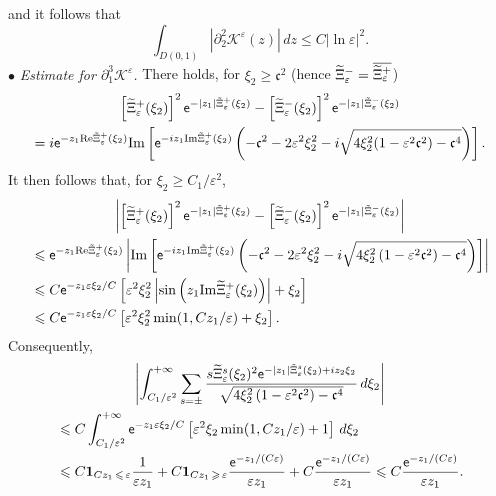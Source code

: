 \documentclass[AHL,Unicode,longabstracts,published]{cedram}
\newcommand*\p{\partial}
\newcommand{\Imm}{\mathrm{Im}}
\newcommand{\Rel}{\mathrm{Re}}
\newcommand*\BK{\mathcal{K}}
\newcommand{\bfun}{\mathbf{1}}
\newcommand*\ex{{\sf e}}
\newcommand*\cs{{\mathfrak c}}
\newcommand*\ii{\infty}
\newcommand*\gs{\geqslant }
\newcommand*\ls{\leqslant }
\newcommand*\e{\varepsilon}
\newcommand*\lne{\lvert \ln \varepsilon \rvert}
\renewcommand*\t{\tilde}
\let\oldtilde\tilde
\renewcommand*{\tilde}[1]{\mathchoice{\widetilde{#1}}{\widetilde{#1}}{\oldtilde{#1}}{\oldtilde{#1}}}
\begin{document}
and it follows that
\[
\int_{D(0,1)} \left\lvert \p_2^2 \BK^\e (z) \right\rvert \, dz \ls C \lne^2.
\]
\noindent $ \bullet $ \emph{Estimate for $ \p_1^3 \BK^\e $.} There holds, for $ \xi_2 \gs \cs^2 $ (hence $ \t\Xi_\e^- = \overline{ \t\Xi_\e^+ }$)
\begin{multline*}
 \left[\t\Xi_\e^+ (\xi_2)\right]^2 \ex^{- |z_1| \t\Xi_\e^+ (\xi_2) } - \left[\t\Xi_\e^- (\xi_2)\right]^2 \ex^{- |z_1| \t\Xi_\e^- (\xi_2) }
\\  = i \ex^{- z_1 \Rel \t\Xi_\e^+ (\xi_2) } \Imm \left[\ex^{- i z_1 \Imm \t\Xi_\e^+ (\xi_2) } \left(- \cs^2 - 2 \e^2 \xi_2^2 - i \sqrt{ 4 \xi_2^2 (1 - \e^2 \cs^2) - \cs^4 } \right) \right].
\end{multline*}
It then follows that, for $ \xi_2 \gs C_1 / \e^{2} $,
\begin{multline*}
\left\lvert \left[\t\Xi_\e^+ (\xi_2)\right]^2 \ex^{- |z_1| \t\Xi_\e^+ (\xi_2) } - \left[\t\Xi_\e^- (\xi_2)\right]^2 \ex^{- |z_1| \t\Xi_\e^- (\xi_2) } \right\rvert
\\
\begin{aligned}
& \ls
\ex^{- z_1 \Rel \t\Xi_\e^+ (\xi_2) } \left\lvert \Imm \left[\ex^{- i z_1 \Imm \t\Xi_\e^+ (\xi_2) } \left(- \cs^2 - 2 \e^2 \xi_2^2 - i \sqrt{ 4 \xi_2^2 \left(1 - \e^2 \cs^2\right) - \cs^4 } \right) \right] \right\rvert
\\ & \ls C \ex^{- z_1 \e \xi_2 / C } \left[\e^2 \xi_2^2 \left\lvert \sin\left(z_1 \Imm \t\Xi_\e^+ (\xi_2)\right) \right\rvert + \xi_2 \right]
\\ & \ls C \ex^{- z_1 \e \xi_2 /C } \left[\e^2 \xi_2^2 \min(1, C z_1 / \e) + \xi_2 \right].
\end{aligned}
\end{multline*}
Consequently,
\begin{multline*}
\left\lvert \int_{ C_1 / \e^{2}}^{+\ii} \sum_{s =\pm} \frac{ s \t\Xi_\e^s (\xi_2)^2 \ex^{- |z_1| \t\Xi_\e^s (\xi_2) + i z_2 \xi_2} }{ \sqrt{ 4 \xi_2^2 \left(1 - \e^2 \cs^2\right) - \cs^4 } } \, d\xi_2 \right\rvert
\\
\begin{aligned}
& \ls C \int_{ C_1 / \e^{2}}^{+\ii} \ex^{- z_1 \e \xi_2 / C } \left[\e^2 \xi_2 \min(1, C z_1 / \e) + 1 \right] \, d\xi_2
\\ & \ls C \bfun_{C z_1\,\ls\,\e} \frac{1}{\e z_1} + C \bfun_{C z_1\,\gs\,\e} \frac{\ex^{- z_1 / (C\e) }}{\e z_1} + C \frac{\ex^{- z_1 / (C\e) }}{\e z_1}
\ls C \frac{\ex^{- z_1 / (C \e) }}{\e z_1}.
\end{aligned}
\end{multline*}
\end{document}
